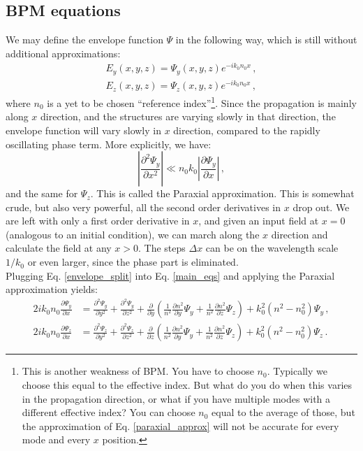 \documentclass[]{article}
\begin{document}
	\subsection{BPM equations}
	We may define the envelope function $\Psi$ in the following way, which is still without additional approximations:
	\begin{subequations}
		\begin{align}
			E_y(x,y,z) = \Psi_y(x,y,z) e^{-ik_0 n_0 x}\, ,\\
			E_z(x,y,z) = \Psi_z(x,y,z) e^{-ik_0 n_0 x}\, ,
		\end{align}
		\label{envelope_split}
	\end{subequations}
	where $n_0$ is a yet to be chosen ``reference index''\footnote{This is another weakness of BPM. You have to choose $n_0$. Typically we choose this equal to the effective index. But what do you do when this varies in the propagation direction, or what if you have multiple modes with a different effective index? You can choose $n_0$ equal to the average of those, but the approximation of Eq. \eqref{paraxial_approx} will not be accurate for every mode and every $x$ position.}. 
	Since the propagation is mainly along $x$ direction, and the structures are varying slowly in that direction, the envelope function will vary slowly in $x$ direction, compared to the rapidly oscillating phase term. More explicitly,
	we have:
	\begin{equation}
		\left|\frac{\partial^2 \Psi_y}{\partial x^2} \right| \ll n_0 k_0 \left| \frac{\partial \Psi_y}{\partial x} \right|\, ,
		\label{paraxial_approx}
	\end{equation}
	and the same for $\Psi_z$. This is called the Paraxial approximation. This is somewhat crude, but also very powerful, all the second order derivatives in $x$ drop out. We are left with only a first order derivative in $x$, and given an input field at $x=0$ (analogous to an initial condition), we can march along the $x$ direction and calculate the field at any $x>0$. The steps $\Delta x$ can be on the wavelength scale $1/k_0$ or even larger, since the phase part is eliminated.\\
	
	Plugging Eq. \eqref{envelope_split} into Eq. \eqref{main_eqs} and applying the Paraxial approximation yields:
	\begin{subequations}
		\begin{align}
			2i k_0 n_0 \frac{\partial \Psi_y}{\partial x} &= \frac{\partial^2\Psi_y}{\partial y^2}+\frac{\partial^2\Psi_y}{\partial z^2}+\frac{\partial}{\partial y}\left(\frac{1}{n^2}\frac{\partial n^2}{\partial y} \Psi_y+\frac{1}{n^2}\frac{\partial n^2}{\partial z} \Psi_z \right)+k_0^2(n^2-n_0^2)\Psi_y \, ,\\
			2i k_0 n_0 \frac{\partial \Psi_z}{\partial x} &= \frac{\partial^2\Psi_z}{\partial y^2}+\frac{\partial^2\Psi_z}{\partial z^2}+\frac{\partial}{\partial z}\left(\frac{1}{n^2}\frac{\partial n^2}{\partial y} \Psi_y+\frac{1}{n^2}\frac{\partial n^2}{\partial z} \Psi_z \right)+k_0^2(n^2-n_0^2)\Psi_z  \, .
		\end{align}
	\end{subequations}
	
\end{document}
